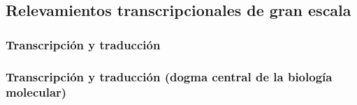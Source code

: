 \documentclass[serif,9pt, t]{beamer}
\begin{document}
\subsection{Relevamientos transcripcionales de gran escala}

\subsubsection*{Transcripción y traducción}
\begin{frame}\frametitle{Transcripción y traducción (dogma central de la biología molecular)}

\begin{figure}[t]
  \centering
\end{figure}

\end{frame}
\end{document}
